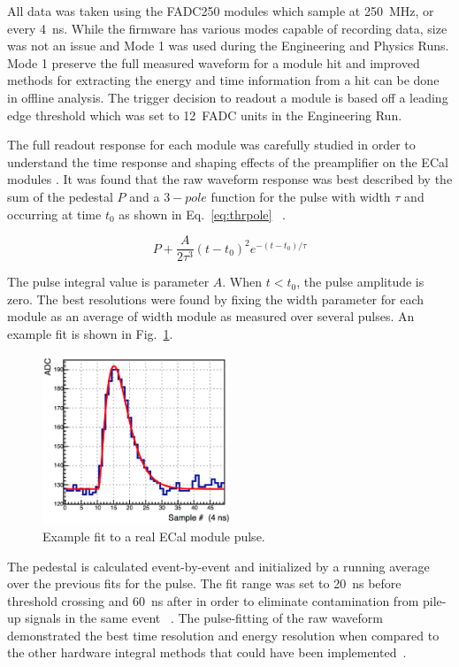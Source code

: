 All data was taken using the FADC250 modules which sample at 250~MHz, or every 4~ns. While the firmware has various modes capable of recording data, size was not an issue and Mode 1 was used during the Engineering and Physics Runs. Mode 1 preserve the full measured waveform for a module hit and improved methods for extracting the energy and time information from a hit can be done in offline analysis. The trigger decision to readout a module is based off a leading edge threshold which was set to 12~FADC units in the Engineering Run. 

The full readout response for each module was carefully studied in order to understand the time response and shaping effects of the preamplifier on the ECal modules \cite{charles_2014}. It was found that the raw waveform response was best described by the sum of the pedestal $P$ and a $3-pole$ function for the pulse with width $\tau$ and occurring at time $t_0$ as shown in Eq.~\eqref{eq:thrpole} ~\cite{charles_2014}.

\begin{equation}
	\label{eq:thrpole}
	P + \dfrac{A}{2\tau^3}(t-t_0)^2e^{-(t-t_0)/\tau} 
\end{equation}

The pulse integral value is parameter $A$. When $t<t_0$, the pulse amplitude is zero. The best resolutions were found by fixing the width parameter for each module as an average of width module as measured over several pulses. An example fit is shown in Fig.~\ref{Figure:mode1fit}.

\begin{figure}[H]
  \centering
      \includegraphics[width=0.5\textwidth]{pics/performance/mode1fit.png}
  \caption[Pulse-fitting to Mode 1 ECal data]{Example fit to a real ECal module pulse.}
  \label{Figure:mode1fit}
\end{figure}

The pedestal is calculated event-by-event and initialized by a running average over the previous fits for the pulse. The fit range was set to 20~ns before threshold crossing and 60~ns after in order to eliminate contamination from pile-up signals in the same event ~\cite{baltzell_ecal_2015}. The pulse-fitting of the raw waveform demonstrated the best time resolution and energy resolution when compared to the other hardware integral methods that could have been implemented~\cite{baltzell_ecal_2015}.
